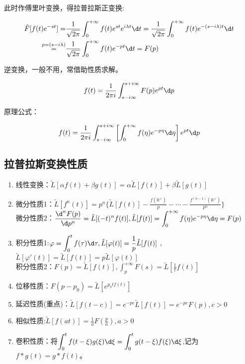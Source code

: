 \documentclass{article}
\begin{document}
此时作傅里叶变换，得拉普拉斯正变换:

$$
\begin{aligned}
\tilde{F}[f(t)e^{-st}]=&\frac{1}{\sqrt{2\pi }}\int_{0}^{+\infty}f(t)e^{st}e^{i\lambda t}\d t=\frac{1}{\sqrt{2\pi }}\int_{0}^{+\infty}f(t)e^{-(s-i\lambda )t} \d t \\
\overset{p=(s-i\lambda )}{=} & \frac{1}{\sqrt{2\pi }}\int_{0}^{+\infty}f(t)e^{-pt}\d t=F(p)
\end{aligned}
$$

逆变换，一般不用，常借助性质求解。

$$
\begin{aligned}
f(t)=\frac{1}{2\pi i}\int_{s-i\infty}^{s+i\infty}F(p)e^{pt}\d p \\
\end{aligned}
$$

原理公式：

$$
\begin{aligned}
f(t)=\frac{1}{2\pi i}\int_{s-i\infty}^{s+i\infty}\left[ \int_{0}^{+\infty}f(\eta) e^{-p\eta }\d \eta \right]e^{pt}\d p \\
\end{aligned}
$$

\subsection{拉普拉斯变换性质}
\begin{enumerate}
    \item 线性变换：$\tilde{L}[\alpha f(t)+\beta g(t)]=\alpha \tilde{L}[f(t)]+\beta \tilde{L}[g(t)]$
    \item 微分性质1：$\displaystyle \tilde{L}[f^{n}(t)]=p^n\{ \tilde{L}[f(t)]-\frac{f(0^+)}{p}-\cdots - \frac{f^{(n-1)}(0^+)}{p^n} \}$
    \\ 微分性质2：$\displaystyle \frac{\d^n F(p)}{\d p^n}=\tilde{L}[(-t)^{n}f(t)],\tilde{L}[f(t)]=\int_{0}^{+\infty}f(\eta) e^{-p\eta }\d \eta=F(p)$
    \item 积分性质1:$\displaystyle \varphi =\int_0^tf(\tau )\d \tau,\tilde{L}[\varphi (t)]=\frac{1}{p}\tilde{L}[f(t)]$
    , $\tilde{L}[\varphi '(t)]=\tilde{L}[f(t)]=p\tilde{L}[\varphi (t)]$
    \\ 积分性质2：$\displaystyle F(p)=\tilde{L}[f(t)],\int_p^{+\infty}F(s)=\tilde{L}[\frac{1}{t}f(t)]$
    \item 位移性质：$\displaystyle F(p-p_0)=\tilde{L}[e^{p_0tf(t)}]$
    \item 延迟性质(重点)：$\tilde{L}[f(t-c)]=e^{-pc}\tilde{L}[f(t)]=e^{-pc}F(p),c>0$
    \item 相似性质:$\displaystyle \tilde{L}[f(at)]=\frac{1}{a}F(\frac{p}{a}),a>0$
    \item 卷积性质：将$\displaystyle \int_0^tf(t-\xi )g(\xi ) \d \xi =\int_0^tg(t-\xi )f(\xi ) \d \xi$,记为$f*g(t)=g*f(t)$。
\end{enumerate}
\end{document}
